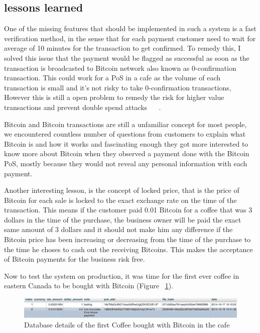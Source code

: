 \subsection{lessons learned}
One of the missing features that should be implemented in such a system is a fast verification method, in the sense that for each payment customer need to wait for average of 10 minutes for the transaction to get confirmed. To remedy this, I solved this issue that the payment would be flagged as successful as soon as the transaction is broadcasted to Bitcoin network also known as 0-confirmation transaction. This could work for a PoS in a cafe as the volume of each transaction is small and it's not risky to take 0-confirmation transactions, However this is still a open problem to remedy the risk for higher value transactions and prevent double spend attacks ~\cite{karame2012two} ~\cite{bamert2013have}.

Bitcoin and Bitcoin transactions are still a unfamiliar concept for most people, we encountered countless number of questions from customers to explain what Bitcoin is and how it works and fascinating enough they got more interested to know more about Bitcoin when they observed a payment done with the Bitcoin PoS, mostly because they would not reveal any personal information with each payment.

Another interesting lesson, is the concept of locked price, that is the price of Bitcoin for each sale is locked to the exact exchange rate on the time of the transaction. This means if the customer paid 0.01 Bitcoin for a coffee that was 3 dollars in the time of the purchase, the business owner will be paid the exact same amount of 3 dollars and it should not make him any difference if the Bitcoin price has been increasing or decreasing from the time of the purchase to the time he choses to cash out the receiving Bitcoins. This makes the acceptance of Bitcoin payments for the business risk free.

Now to test the system on production, it was time for the first ever coffee in eastern Canada to be bought with Bitcoin (Figure ~\ref{fig:firsttransaction}).

\begin{figure}[htb!p]
\centering
\includegraphics[width=\linewidth]{fig/first_cafe_transaction.png}
  \caption{Database details of the first Coffee bought with Bitcoin in the cafe}
\label{fig:firsttransaction}
\end{figure}



